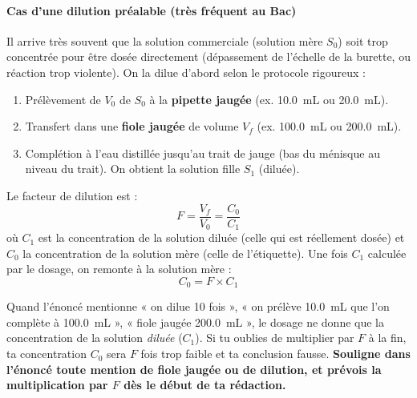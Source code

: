 \documentclass[11pt]{article}
\newcommand{\cle}[1]{{\popxbold\color{popdark}#1}}
\begin{document}
\paragraph{Cas d'une dilution préalable (très fréquent au Bac)}
Il arrive très souvent que la solution commerciale (solution mère $S_0$) soit trop concentrée pour être dosée directement (dépassement de l'échelle de la burette, ou réaction trop violente). On la \cle{dilue} d'abord selon le protocole rigoureux :
\begin{enumerate}
\item Prélèvement de $V_0$ de $S_0$ à la \textbf{pipette jaugée} (ex. \SI{10,0}{mL} ou \SI{20,0}{mL}).
\item Transfert dans une \textbf{fiole jaugée} de volume $V_f$ (ex. \SI{100,0}{mL} ou \SI{200,0}{mL}).
\item Complétion à l'eau distillée jusqu'au trait de jauge (bas du ménisque au niveau du trait). On obtient la solution fille $S_1$ (diluée).
\end{enumerate}

Le \cle{facteur de dilution} est :
\[ F = \frac{V_f}{V_0} = \frac{C_0}{C_1} \]
où $C_1$ est la concentration de la solution diluée (celle qui est réellement dosée) et $C_0$ la concentration de la solution mère (celle de l'étiquette). Une fois $C_1$ calculée par le dosage, on remonte à la solution mère :
\[ C_0 = F \times C_1 \]

\begin{attention}
Quand l'énoncé mentionne « on dilue 10 fois », « on prélève \SI{10,0}{mL} que l'on complète à \SI{100,0}{mL} », « fiole jaugée \SI{200,0}{mL} », le dosage ne donne que la concentration de la solution \emph{diluée} ($C_1$). Si tu oublies de multiplier par $F$ à la fin, ta concentration $C_0$ sera $F$ fois trop faible et ta conclusion fausse. \textbf{Souligne dans l'énoncé toute mention de fiole jaugée ou de dilution, et prévois la multiplication par $F$ dès le début de ta rédaction.}
\end{attention}
\end{document}
